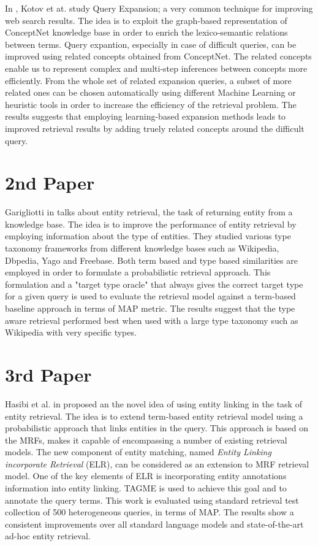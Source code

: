 \documentclass[letterpaper]{article}
\begin{document}
In \cite{concept_feedback}, Kotov et at. study Query Expansion; a very common technique for improving web search results. The idea is to exploit the graph-based representation of ConceptNet knowledge base in order to enrich the lexico-semantic relations between terms. Query expantion, especially in case of difficult queries, can be improved using related concepts obtained from ConceptNet. The related concepts enable us to represent complex and multi-step inferences between concepts more efficiently. From the whole set of related expansion queries, a subset of more related ones can be chosen automatically using different Machine Learning or heuristic tools in order to increase the efficiency of the retrieval problem. The results suggests that employing learning-based expansion methods leads to improved retrieval results by adding truely related concepts around the difficult query.


\section{2nd Paper}

Garigliotti in \cite{Garigliotti_2017} talks about entity retrieval, the task of returning entity from a knowledge base. The idea is to improve the performance of entity retrieval by employing information about the type of entities. They studied various type taxonomy frameworks from different knowledge bases such as Wikipedia, Dbpedia, Yago and Freebase. Both term based and type based similarities are employed in order to formulate a probabilistic retrieval approach. This formulation and a "target type oracle" that always gives the correct target type for a given query is used to evaluate the retrieval model against a term-based baseline approach in terms of MAP metric. The results suggest that the type aware retrieval performed best when used with a large type taxonomy such as Wikipedia with very specific types.


\section{3rd Paper}

Hasibi et al. in \cite{faegheh} proposed an the novel idea of using entity linking in the task of entity retrieval. The idea is to extend term-based entity retrieval model using a probabilistic approach that links entities in the query. This approach is based on the MRFs, makes it capable of encompassing a number of existing retrieval models. The new component of entity matching, named \textit{Entity Linking incorporate Retrieval} (ELR), can be considered as an extension to MRF retrieval model. One of the key elements of ELR is incorporating entity annotations information into entity linking. TAGME is used to achieve this goal and to annotate the query terms. This work is evaluated using standard retrieval test collection of 500 heterogeneous queries, in terms of MAP. The results show a consistent improvements over all standard language models and state-of-the-art ad-hoc entity retrieval.
\end{document}
